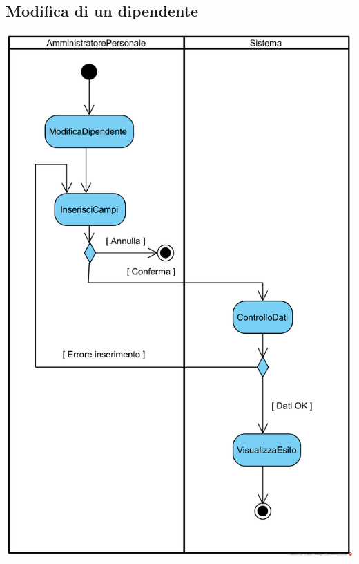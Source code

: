 \documentclass[12pt]{article}
\begin{document}
\subsection{Modifica di un dipendente}
\begin{center}
\includegraphics[width=\textwidth]{ActivityDiagram/AmministratorePersonaleModificaDipendente}
\end{center}
\end{document}
